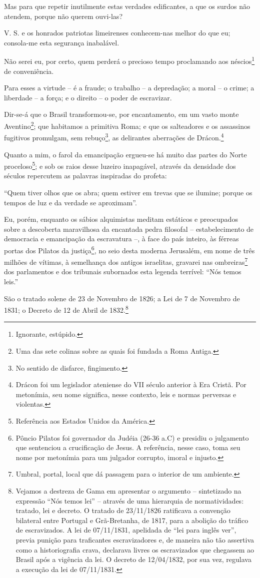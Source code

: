 Mas para que repetir inutilmente estas verdades edificantes, a que os
surdos não atendem, porque não querem ouvi-las?

V. S. e os honrados patriotas limeirenses conhecem-nas melhor do que eu;
consola-me esta segurança inabalável.

Não serei eu, por certo, quem perderá o precioso tempo proclamando aos
néscios\footnote{Ignorante, estúpido.} de conveniência.

Para esses a virtude -- é a fraude; o trabalho -- a depredação; a moral
-- o crime; a liberdade -- a força; e o direito -- o poder de
escravizar.

Dir-se-á que o Brasil transformou-se, por encantamento, em um vasto
monte Aventino\footnote{Uma das sete colinas sobre as quais foi
  fundada a Roma Antiga.}; que habitamos a primitiva Roma; e que os
salteadores e os assassinos fugitivos promulgam, sem rebuço\footnote{
  No sentido de disfarce, fingimento.}, as delirantes aberrações de
Drácon.\footnote{Drácon foi um legislador ateniense do VII século
  anterior à Era Cristã. Por metonímia, seu nome significa, nesse
  contexto, leis e normas perversas e violentas.}

Quanto a mim, o farol da emancipação ergueu-se há muito das partes do
Norte proceloso\footnote{Referência aos Estados Unidos da América.}; e
sob os raios desse luzeiro inapagável, através da densidade dos séculos
repercutem as palavras inspiradas do profeta:

``Quem tiver olhos que os abra; quem estiver em trevas que se ilumine;
porque os tempos de luz e da verdade se aproximam''.

Eu, porém, enquanto os sábios alquimistas meditam estáticos e
preocupados sobre a descoberta maravilhosa da encantada pedra filosofal
-- estabelecimento de democracia e emancipação da escravatura --, à face
do país inteiro, às férreas portas dos Pilatos da justiça\footnote{
  Pôncio Pilatos foi governador da Judéia (26-36 a.C) e presidiu o
  julgamento que sentenciou a crucificação de Jesus. A referência, nesse
  caso, toma seu nome por metonímia para um julgador corrupto, imoral e
  injusto.}, no seio desta moderna Jerusalém, em nome de três milhões de
vítimas, à semelhança dos antigos israelitas, gravarei nas
ombreiras\footnote{Umbral, portal, local que dá passagem para o
  interior de um ambiente.} dos parlamentos e dos tribunais subornados
esta legenda terrível: ``Nós temos leis.''

São o tratado solene de 23 de Novembro de 1826; a Lei de 7 de Novembro
de 1831; o Decreto de 12 de Abril de 1832.\footnote{Vejamos a destreza
  de Gama em apresentar o argumento -- sintetizado na expressão ``Nós
  temos lei'' -- através de uma hierarquia de normatividades: tratado,
  lei e decreto. O tratado de 23/11/1826 ratificava a convenção
  bilateral entre Portugal e Grã-Bretanha, de 1817, para a abolição do
  tráfico de escravizados. A lei de 07/11/1831, apelidada de ``lei para
  inglês ver'', previa punição para traficantes escravizadores e, de
  maneira não tão assertiva como a historiografia crava, declarava
  livres os escravizados que chegassem ao Brasil após a vigência da lei.
  O decreto de 12/04/1832, por sua vez, regulava a execução da lei de
  07/11/1831.}

